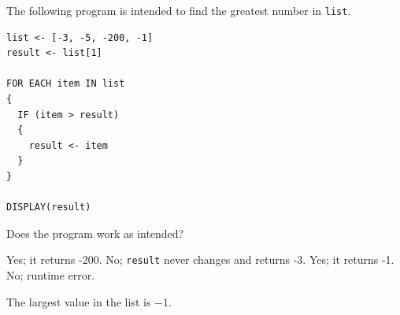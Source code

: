 \question[5]
The following program is intended to find the greatest number in \texttt{list}.
\begin{lstlisting}[style=pseudo]
list <- [-3, -5, -200, -1]
result <- list[1]

FOR EACH item IN list
{
  IF (item > result)
  {
    result <- item
  }
}

DISPLAY(result)
\end{lstlisting}
Does the program work as intended?
\begin{choices}
  \choice Yes; it returns -200.
  \choice No; \texttt{result} never changes and returns -3.
  \CorrectChoice Yes; it returns -1.
  \choice No; runtime error.
\end{choices}
\begin{solution}
  The largest value in the list is \(-1\).
\end{solution}

\newpage


